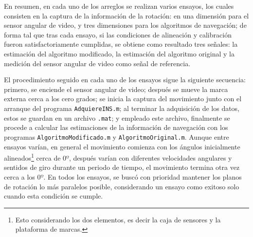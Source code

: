\documentclass[10pt]{report}
\numberwithin{equation}{chapter}
\numberwithin{algorithm}{chapter}
\begin{document}
En resumen, en cada uno de los arreglos se realizan varios ensayos, los cuales consisten en la captura de la información de la rotación: en una dimensión para el sensor angular de video, y tres dimensiones para los algoritmos de navegación; de forma tal que tras cada ensayo, si las condiciones de alineación y calibración fueron satisfactoriamente cumplidas, se obtiene como resultado tres señales: la estimación del algoritmo modificado, la estimación del algoritmo original y la medición del sensor angular de video como señal de referencia.\par
El procedimiento seguido en cada uno de los ensayos sigue la siguiente secuencia: primero, se enciende el sensor angular de video; después se mueve la marca externa cerca a los cero grados; se inicia la captura del movimiento junto con el arranque del programa \texttt{AdquiereINS.m}; al terminar la adquisición de los datos, estos se guardan en un archivo \texttt{.mat}; y empleado este archivo, finalmente se procede a calcular las estimaciones de la información de navegación con los programas \texttt{AlgoritmoModificado.m} y \texttt{AlgoritmoOriginal.m}. Aunque entre ensayos varían, en general el movimiento comienza con los ángulos inicialmente alineados\footnote{Esto considerando los dos elementos, es decir la caja de sensores y la plataforma de marcas.} cerca de $0º$, después varían con diferentes velocidades angulares y sentidos de giro durante un periodo de tiempo, el movimiento termina otra vez cerca a los $0º$. En todos los ensayos, se buscó con prioridad mantener los planos de rotación lo más paralelos posible, considerando un ensayo como exitoso solo cuando esta condición se cumple.
\end{document}
